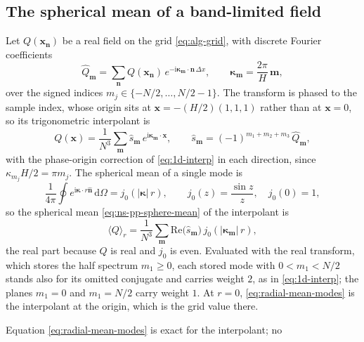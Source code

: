 \documentclass{article}
\begin{document}
\subsection{The spherical mean of a band-limited field}\label{ssec:radial-mean}
Let $Q(\mathbf{x_n})$ be a real field on the grid \eqref{eq:alg-grid}, with
discrete Fourier coefficients
\begin{equation}\label{eq:radial-dft}
  \hat Q_{\mathbf{m}} = \sum_{\mathbf{n}} Q(\mathbf{x_n})\,
  e^{-\mathrm{i} \boldsymbol{\kappa}_{\mathbf{m}} \cdot \mathbf{n}\, \Delta x},
  \qquad
  \boldsymbol{\kappa}_{\mathbf{m}} = \frac{2\pi}{H}\, \mathbf{m},
\end{equation}
over the signed indices $m_j \in \{-N/2, \dots, N/2 - 1\}$. The transform is
phased to the sample index, whose origin sits at $\mathbf{x} = -(H/2)(1,1,1)$
rather than at $\mathbf{x} = 0$, so its trigonometric interpolant is
\begin{equation}\label{eq:radial-interpolant}
  Q(\mathbf{x}) = \frac{1}{N^3} \sum_{\mathbf{m}} \hat s_{\mathbf{m}}\,
  e^{\mathrm{i} \boldsymbol{\kappa}_{\mathbf{m}} \cdot \mathbf{x}},
  \qquad
  \hat s_{\mathbf{m}} = (-1)^{m_1 + m_2 + m_3}\, \hat Q_{\mathbf{m}},
\end{equation}
with the phase-origin correction of \eqref{eq:1d-interp} in each direction,
since $\kappa_{m_j} H/2 = \pi m_j$. The spherical mean of a single mode is
\begin{equation}\label{eq:radial-mode-mean}
  \frac{1}{4\pi} \oint e^{\mathrm{i} \boldsymbol{\kappa} \cdot r \hat{\mathbf{n}}}\,
  \mathrm{d}\Omega
  = j_0(|\boldsymbol{\kappa}|\, r),
  \qquad
  j_0(z) = \frac{\sin z}{z}, \quad j_0(0) = 1,
\end{equation}
so the spherical mean \eqref{eq:ns-pp-sphere-mean} of the interpolant is
\begin{equation}\label{eq:radial-mean-modes}
  \langle Q \rangle_r = \frac{1}{N^3} \sum_{\mathbf{m}}
  \mathrm{Re}\bigl( \hat s_{\mathbf{m}} \bigr)\, j_0(|\boldsymbol{\kappa}_{\mathbf{m}}|\, r),
\end{equation}
the real part because $Q$ is real and $j_0$ is even. Evaluated with the real
transform, which stores the half spectrum $m_1 \ge 0$, each stored mode with
$0 < m_1 < N/2$ stands also for its omitted conjugate and carries weight $2$,
as in \eqref{eq:1d-interp}; the planes $m_1 = 0$ and $m_1 = N/2$ carry weight
$1$. At $r = 0$, \eqref{eq:radial-mean-modes} is the interpolant at the
origin, which is the grid value there.
\par
Equation \eqref{eq:radial-mean-modes} is exact for the interpolant; no
\end{document}
